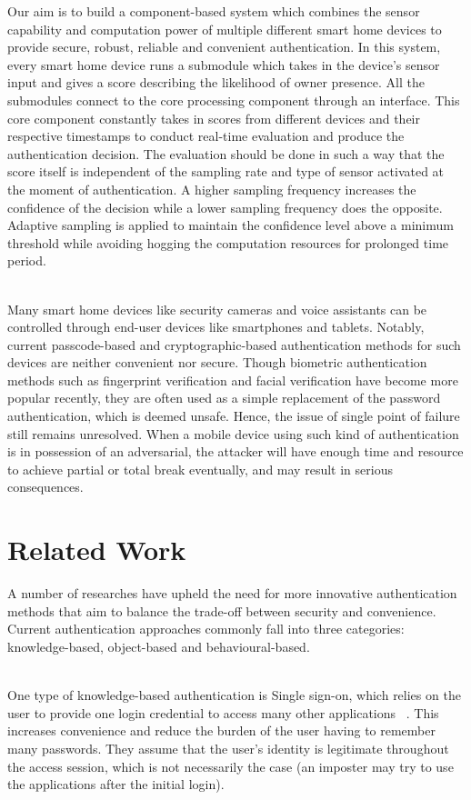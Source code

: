 \documentclass[a4paper, 11pt]{article}
\begin{document}
Our aim is to build a component-based system which combines the sensor capability and computation power of multiple different smart home devices to provide secure, robust, reliable and convenient authentication. In this system, every smart home device runs a submodule which takes in the device’s sensor input and gives a score describing the likelihood of owner presence. All the submodules connect to the core processing component through an interface. This core component constantly takes in scores from different devices and their respective timestamps to conduct real-time evaluation and produce the authentication decision. The evaluation should be done in such a way that the score itself is independent of the sampling rate and type of sensor activated at the moment of authentication. A higher sampling frequency increases the confidence of the decision while a lower sampling frequency does the opposite. Adaptive sampling is applied to maintain the confidence level above a minimum threshold while avoiding hogging the computation resources for prolonged time period.

\noindent\\
Many smart home devices like security cameras and voice assistants can be controlled through end-user devices like smartphones and tablets. Notably, current passcode-based and cryptographic-based authentication methods for such devices are neither convenient nor secure. Though biometric authentication methods such as fingerprint verification and facial verification have become more popular recently, they are often used as a simple replacement of the password authentication, which is deemed unsafe. Hence, the issue of single point of failure still remains unresolved. When a mobile device using such kind of authentication is in possession of an adversarial, the attacker will have enough time and resource to achieve partial or total break eventually, and may result in serious consequences.

\section*{Related Work}

A number of researches have upheld the need for more innovative authentication methods that aim to balance the trade-off between security and convenience. Current authentication approaches commonly fall into three categories: knowledge-based, object-based and behavioural-based.

\noindent\\
One type of knowledge-based authentication is Single sign-on, which relies on the user to provide one login credential to access many other applications ~\cite{al2016continuous,radha2012survey}. This increases convenience and reduce the burden of the user having to remember many passwords. They assume that the user’s identity is legitimate throughout the access session, which is not necessarily the case (an imposter may try to use the applications after the initial login).  
\end{document}
